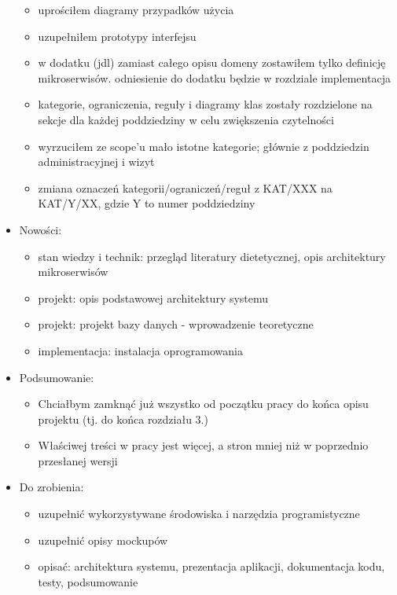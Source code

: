 \begin{itemize}
\begin{itemize}
	\item uprościłem diagramy przypadków użycia
	\item uzupełniłem prototypy interfejsu
	\item w dodatku (jdl) zamiast całego opisu domeny zostawiłem tylko definicję mikroserwisów. odniesienie do dodatku będzie w rozdziale implementacja
	\item kategorie, ograniczenia, reguły i diagramy klas zostały rozdzielone na sekcje dla każdej poddziedziny w celu zwiększenia czytelności
	\item wyrzuciłem ze scope'u mało istotne kategorie; głównie z poddziedzin administracyjnej i wizyt
	\item zmiana oznaczeń kategorii/ograniczeń/reguł z KAT/XXX na KAT/Y/XX, gdzie Y to numer poddziedziny
	\end{itemize}
\item Nowości:
    \begin{itemize}
	\item stan wiedzy i technik: przegląd literatury dietetycznej, opis architektury mikroserwisów
	\item projekt: opis podstawowej architektury systemu
	\item projekt: projekt bazy danych - wprowadzenie teoretyczne
	\item implementacja: instalacja oprogramowania
	\end{itemize}
\item Podsumowanie:
    \begin{itemize}
	\item Chciałbym zamknąć już wszystko od początku pracy do końca opisu projektu (tj. do końca rozdziału 3.)
	\item Właściwej treści w pracy jest więcej, a stron mniej niż w poprzednio przesłanej wersji
	\end{itemize}
\item Do zrobienia:
    \begin{itemize}
	\item uzupełnić wykorzystywane środowiska i narzędzia programistyczne
	\item uzupełnić opisy mockupów
	\item opisać: architektura systemu, prezentacja aplikacji, dokumentacja kodu, testy, podsumowanie
	\end{itemize}
\end{itemize}

\cleardoublepage
{}
